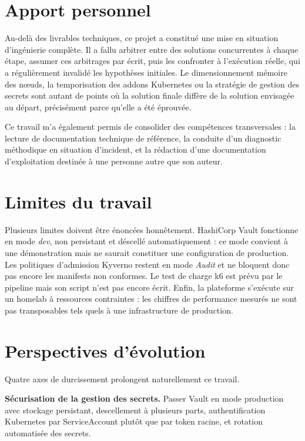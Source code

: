 \documentclass[12pt,a4paper,twoside,openright]{report}
\begin{document}
\section*{Apport personnel}

Au-delà des livrables techniques, ce projet a constitué une mise en situation
d'ingénierie complète. Il a fallu arbitrer entre des solutions concurrentes à chaque
étape, assumer ces arbitrages par écrit, puis les confronter à l'exécution réelle,
qui a régulièrement invalidé les hypothèses initiales. Le dimensionnement mémoire des
n\oe uds, la temporisation des addons Kubernetes ou la stratégie de gestion des
secrets sont autant de points où la solution finale diffère de la solution envisagée
au départ, précisément parce qu'elle a été éprouvée.

Ce travail m'a également permis de consolider des compétences transversales : la
lecture de documentation technique de référence, la conduite d'un diagnostic
méthodique en situation d'incident, et la rédaction d'une documentation d'exploitation
destinée à une personne autre que son auteur.

\section*{Limites du travail}

Plusieurs limites doivent être énoncées honnêtement. HashiCorp Vault fonctionne en
mode \emph{dev}, non persistant et déscellé automatiquement : ce mode convient à une
démonstration mais ne saurait constituer une configuration de production. Les
politiques d'admission Kyverno restent en mode \emph{Audit} et ne bloquent donc pas
encore les manifests non conformes. Le test de charge k6 est prévu par le pipeline
mais son script n'est pas encore écrit. Enfin, la plateforme s'exécute sur un homelab
à ressources contraintes : les chiffres de performance mesurés ne sont pas
transposables tels quels à une infrastructure de production.

\section*{Perspectives d'évolution}

Quatre axes de durcissement prolongent naturellement ce travail.

\textbf{Sécurisation de la gestion des secrets.} Passer Vault en mode production avec
stockage persistant, descellement à plusieurs parts, authentification Kubernetes par
ServiceAccount plutôt que par token racine, et rotation automatisée des secrets.
\end{document}
